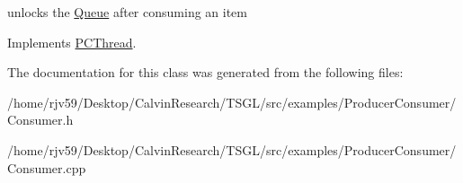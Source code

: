 unlocks the \hyperlink{class_queue}{Queue} after consuming an item 

Implements \hyperlink{class_p_c_thread}{P\+C\+Thread}.



The documentation for this class was generated from the following files\+:\begin{DoxyCompactItemize}
\item 
/home/rjv59/\+Desktop/\+Calvin\+Research/\+T\+S\+G\+L/src/examples/\+Producer\+Consumer/Consumer.\+h\item 
/home/rjv59/\+Desktop/\+Calvin\+Research/\+T\+S\+G\+L/src/examples/\+Producer\+Consumer/Consumer.\+cpp\end{DoxyCompactItemize}

